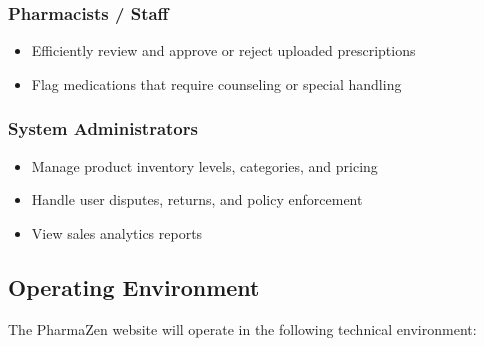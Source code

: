 \documentclass[12pt, a4paper]{article}
\begin{document}
\subsubsection{Pharmacists / Staff}
\begin{itemize}[leftmargin=1.5em, itemsep=3pt]
  \item Efficiently review and approve or reject uploaded prescriptions
  \item Flag medications that require counseling or special handling
\end{itemize}

\subsubsection{System Administrators}
\begin{itemize}[leftmargin=1.5em, itemsep=3pt]
  \item Manage product inventory levels, categories, and pricing
  \item Handle user disputes, returns, and policy enforcement
  \item View sales analytics reports
\end{itemize}

\subsection{Operating Environment}

The PharmaZen website will operate in the following technical environment:
\end{document}
